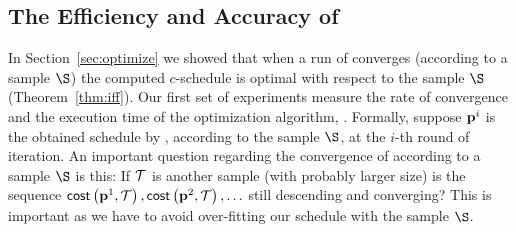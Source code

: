  
\begin{table}[h]
\centering
{}
\caption{The datasets and corresponding statistics.}\label{table:datasets}
\end{table}







\subsection{The Efficiency and Accuracy of {\appoptimizer}}
In Section~\ref{sec:optimize}  we showed that when a run of {\appoptimizer} converges (according to a sample $\S$) the computed $c$-schedule is optimal with respect to the sample $\S$ (Theorem~\ref{thm:iff}). Our first set of experiments measure the rate of convergence and the execution time of the optimization algorithm, {\appoptimizer}. Formally, 
suppose $\mathbf{p}^i$ is the obtained schedule by {\appoptimizer}, according to the sample $\S$, at the $i$-th round of iteration. An important question regarding the  convergence of {\appoptimizer} according to a sample $\S$ is this: If $\mathcal{T}$ is another sample (with probably larger size) is the sequence $\mathsf{cost}\left( \mathbf{p}^1,\mathcal{T} \right),\mathsf{cost}\left( \mathbf{p}^2,\mathcal{T} \right),\ldots$ still descending and converging? This is important as we have to  avoid over-fitting our schedule with the sample $\S$.

